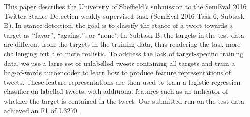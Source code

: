 This paper describes the University of Sheffield's submission to the SemEval 2016 Twitter Stance Detection weakly supervised task (SemEval 2016 Task 6, Subtask B). In stance detection, the goal is to classify the stance of a tweet towards a target as ``favor'', ``against'', or ``none''. In Subtask B, the targets in the test data are different from the targets in the training data, thus rendering the task more challenging but also more realistic. To address the lack of target-specific training data, we use a large set of unlabelled tweets containing all targets and train a bag-of-words autoencoder to learn how to produce feature representations of tweets. These feature representations are then used to train a logistic regression classifier on labelled tweets, with additional features such as an indicator of whether the target is contained in the tweet. Our submitted run on the test data achieved an F1 of 0.3270.
